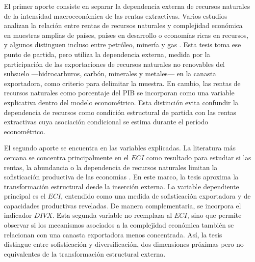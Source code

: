 \documentclass[../../TFM.tex]{subfiles}
\begin{document}
	El primer aporte consiste en separar la dependencia externa de recursos naturales de la intensidad macroeconómica de las rentas extractivas. Varios estudios analizan la relación entre rentas de recursos naturales y complejidad económica en muestras amplias de países, países en desarrollo o economías ricas en recursos, y algunos distinguen incluso entre petróleo, minería y gas \parencite{Canh2020,Hoang2023,Li2024,Ul-Durar2023,Valentine2024,Zhang2023}. Esta tesis toma ese punto de partida, pero utiliza la dependencia externa, medida por la participación de las exportaciones de recursos naturales no renovables del subsuelo ---hidrocarburos, carbón, minerales y metales--- en la canasta exportadora, como criterio para delimitar la muestra. En cambio, las rentas de recursos naturales como porcentaje del PIB se incorporan como una variable explicativa dentro del modelo econométrico. Esta distinción evita confundir la dependencia de recursos como condición estructural de partida con las rentas extractivas cuya asociación condicional se estima durante el período econométrico.

	El segundo aporte se encuentra en las variables explicadas. La literatura más cercana se concentra principalmente en el $ECI$ como resultado para estudiar si las rentas, la abundancia o la dependencia de recursos naturales limitan la sofisticación productiva de las economías \parencite{Ajide2022,Canh2020,Hoang2023,Owjimehr2024,Valentine2024,Zhang2023}. En este marco, la tesis aproxima la transformación estructural desde la inserción externa. La variable dependiente principal es el $ECI$, entendido como una medida de sofisticación exportadora y de capacidades productivas reveladas. De manera complementaria, se incorpora el indicador $DIVX$. Esta segunda variable no reemplaza al $ECI$, sino que permite observar si los mecanismos asociados a la complejidad económica también se relacionan con una canasta exportadora menos concentrada. Así, la tesis distingue entre sofisticación y diversificación, dos dimensiones próximas pero no equivalentes de la transformación estructural externa.
\end{document}

